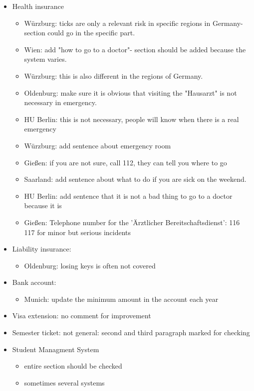 \begin{itemize}
        \item Health insurance
          \begin{itemize}
            \item Würzburg: ticks are only a relevant risk in specific regions in Germany- section could go in the specific part.
            \item Wien: add "how to go to a doctor"- section should be added because the system varies.
            \item Würzburg: this is also different in the regions of Germany.
            \item Oldenburg: make sure it is obvious that visiting the "Hausarzt" is not necessary in emergency.
            \item HU Berlin: this is not necessary, people will know when there is a real emergency
            \item Würzburg: add sentence about emergency room
            \item Gießen: if you are not sure, call 112, they can tell you where to go
            \item Saarland: add sentence about what to do if you are sick on the weekend.
            \item HU Berlin: add sentence that it is not a bad thing to go to a doctor because it is
            \item Gießen: Telephone number for the 'Ärztlicher Bereitschaftsdienst': 116 117 for minor but serious incidents
          \end{itemize}
        \item Liability insurance:
          \begin{itemize}
            \item Oldenburg: losing keys is often not covered
          \end{itemize}
        \item Bank account:
          \begin{itemize}
            \item Munich: update the minimum amount in the account each year
          \end{itemize}
        \item Visa extension: no comment for improvement
        \item Semester ticket: not general: second and third paragraph marked for checking
        \item Student Managment System
          \begin{itemize}
            \item entire section should be checked
            \item sometimes several systems
          \end{itemize}


\end{itemize}
